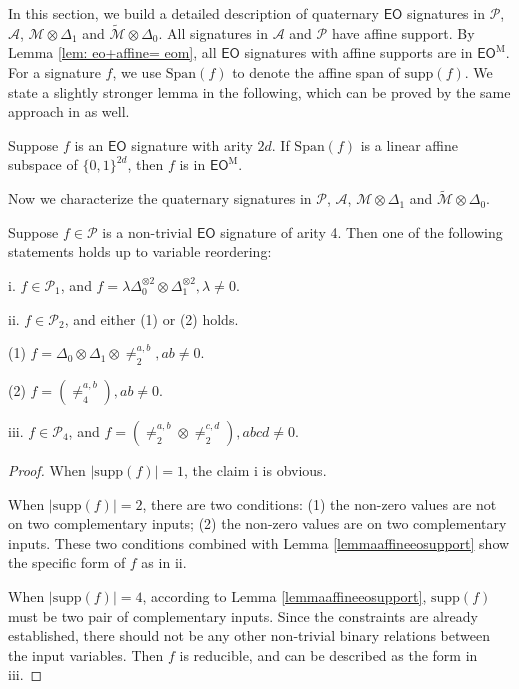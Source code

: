 \documentclass[a4paper,UKenglish,cleveref, autoref, thm-restate]{lipics-v2021}
\newcommand{\eo}[0]{\textsf{EO}}
\newcommand{\su}[0]{\text{supp}}
\newcommand{\eom}[1][\text{M}]{\textsf{EO}^{#1}}
\begin{document}
In this section, we build a detailed description of quaternary $\eo$ signatures in $\mathscr{P}$, $\mathscr{A}$, $\mathscr{M}\otimes\Delta_1$ and $\widetilde{\mathscr{M}}\otimes\Delta_0$.
All signatures in $\mathscr{A}$ and $\mathscr{P}$ have affine support. By Lemma \ref{lem: eo+affine= eom}, all $\eo$ signatures with affine supports are in $\eom$. For a signature $f$, we use $\text{Span}(f)$ to denote the affine span of $\su(f)$. We state a slightly stronger lemma in the following, which can be proved by the same approach in \cite[Lemma 5.7]{cai2020beyond} as well.

\begin{lemma}\cite{cai2020beyond} \label{lemmaaffineeosupport}
Suppose $f$ is an $\eo$ signature with arity $2d$. If $\text{Span}(f)$ is a linear affine subspace of $\{0,1\}^{2d}$, then $f$ is in $\eom$.

\end{lemma}

Now we characterize the quaternary signatures in $\mathscr{P}$, $\mathscr{A}$, $\mathscr{M}\otimes\Delta_1$ and $\widetilde{\mathscr{M}}\otimes\Delta_0$.

\begin{lemma}\label{lem:arity4inP}
Suppose $f\in \mathscr{P}$ is a non-trivial $\eo$ signature of arity 4. Then one of the following statements holds up to variable reordering:

i. $f\in\mathscr{P}_1$, and $f=\lambda\Delta_0^{\otimes2}\otimes\Delta_1^{\otimes2},\lambda\neq0$. 

ii. $f\in\mathscr{P}_2$, and either (1) or (2) holds.

(1) $f=\Delta_0\otimes\Delta_1\otimes\neq_2^{a,b},ab\neq 0$. 

(2) $f=(\neq_4^{a,b}), ab\neq0.$

iii. $f\in\mathscr{P}_4$, and $f=(\neq_2^{a,b}\otimes\neq_2^{c,d}), abcd\neq0$.
\end{lemma}
\begin{proof}
When $|\su(f)|=1$, the claim i is obvious.

When $|\su(f)|=2$, there are two conditions: (1) the non-zero values are not on two complementary inputs; (2) the non-zero values are on two complementary inputs. These two conditions combined with Lemma \ref{lemmaaffineeosupport} show the specific form of $f$ as in ii.

When $|\su(f)|=4$, according to Lemma \ref{lemmaaffineeosupport}, $\su(f)$ must be two pair of complementary inputs. Since the constraints are already established, there should not be any other non-trivial binary relations between the input variables. Then $f$ is reducible, and can be described as the form in iii.
\end{proof}
\end{document}
